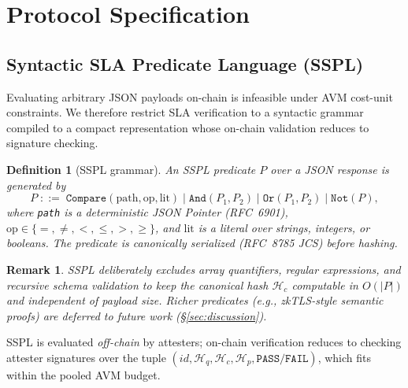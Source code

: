 \documentclass[journal]{IEEEtran}
\newtheorem{definition}[theorem]{Definition}
\newtheorem{remark}[theorem]{Remark}
\newcommand{\set}[1]{\mathcal{#1}}
\begin{document}
\section{Protocol Specification}
\label{sec:protocol}

\subsection{Syntactic SLA Predicate Language (SSPL)}
Evaluating arbitrary JSON payloads on-chain is infeasible under AVM
cost-unit constraints.
We therefore restrict SLA verification to a syntactic grammar compiled
to a compact representation whose on-chain validation reduces to
signature checking.

\begin{definition}[SSPL grammar]
\label{def:sspl}
An SSPL predicate $P$ over a JSON response is generated by
\[
P \;::=\; \texttt{Compare}(\text{path}, \text{op}, \text{lit})
\mid \texttt{And}(P_1, P_2)
\mid \texttt{Or}(P_1, P_2)
\mid \texttt{Not}(P),
\]
where \texttt{path} is a deterministic JSON Pointer (RFC~6901),
$\text{op} \in \{=, \ne, <, \le, >, \ge\}$, and $\text{lit}$ is a
literal over strings, integers, or booleans.
The predicate is canonically serialized (RFC~8785 JCS) before
hashing.
\end{definition}

\begin{remark}
\label{rem:sspl-scope}
SSPL deliberately excludes array quantifiers, regular expressions,
and recursive schema validation to keep the canonical hash $\set{H}_c$
computable in $O(|P|)$ and independent of payload size.
Richer predicates (e.g., zkTLS-style semantic proofs) are deferred
to future work (\S\ref{sec:discussion}).
\end{remark}

SSPL is evaluated \emph{off-chain} by attesters; on-chain
verification reduces to checking attester signatures over the tuple
$(id, \set{H}_q, \set{H}_c, \set{H}_p, \texttt{PASS/FAIL})$, which
fits within the pooled AVM budget.
\end{document}
